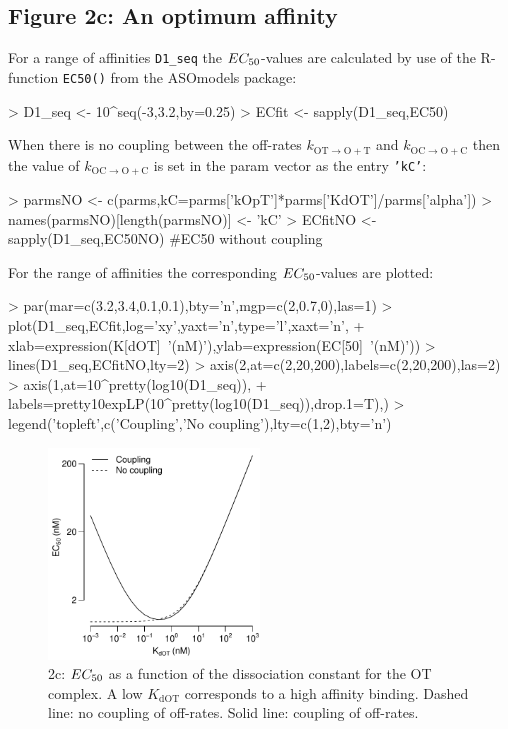 \documentclass{article}
\newenvironment{Ncenter}{%
  \setlength\topsep{-10pt}
  \setlength\parskip{-100pt}
  \begin{center}
}{%
  \end{center}
}
\newcommand{\kmo}{k_{\mathrm{OT \to O+T}}}
\newcommand{\kD}{k_{\mathrm{OC \to O+C}}}
\newcommand{\EC}{EC_{\rm{50}}}
\newcommand{\KdOT}{K_{\mathrm{dOT}}}
\begin{document}
\subsection*{Figure 2c: An optimum affinity}
For a range of affinities \texttt{D1\_seq} the $\EC$-values are calculated by use of the R-function \texttt{EC50()} from the ASOmodels package:
\begin{Schunk}
\begin{Sinput}
> D1_seq <- 10^seq(-3,3.2,by=0.25)
> ECfit <- sapply(D1_seq,EC50)
\end{Sinput}
\end{Schunk}
When there is no coupling between the off-rates $\kmo$ and $\kD$ then the value of $\kD$ is set in the param vector as the entry \texttt{'kC'}:
\begin{Schunk}
\begin{Sinput}
> parmsNO <- c(parms,kC=parms['kOpT']*parms['KdOT']/parms['alpha'])
> names(parmsNO)[length(parmsNO)] <- 'kC'
> ECfitNO <- sapply(D1_seq,EC50NO) #EC50 without coupling
\end{Sinput}
\end{Schunk}
For the range of affinities the corresponding $\EC$-values are plotted:
\begin{Schunk}
\begin{Sinput}
> par(mar=c(3.2,3.4,0.1,0.1),bty='n',mgp=c(2,0.7,0),las=1)
> plot(D1_seq,ECfit,log='xy',yaxt='n',type='l',xaxt='n',
+      xlab=expression(K[dOT]~'(nM)'),ylab=expression(EC[50]~'(nM)'))
> lines(D1_seq,ECfitNO,lty=2)
> axis(2,at=c(2,20,200),labels=c(2,20,200),las=2)
> axis(1,at=10^pretty(log10(D1_seq)),
+      labels=pretty10expLP(10^pretty(log10(D1_seq)),drop.1=T),)
> legend('topleft',c('Coupling','No coupling'),lty=c(1,2),bty='n')
\end{Sinput}
\end{Schunk}
\begin{figure}[!h]
\begin{Ncenter}
\includegraphics[width=0.5\textwidth]{Vignette2-Fig3}
\end{Ncenter}
\caption{2c: $\EC$ as a function of the dissociation constant for the OT complex. A low $\KdOT$ corresponds to a high affinity binding. Dashed line: no coupling of off-rates. Solid line: coupling of off-rates.}
\end{figure}
\end{document}
